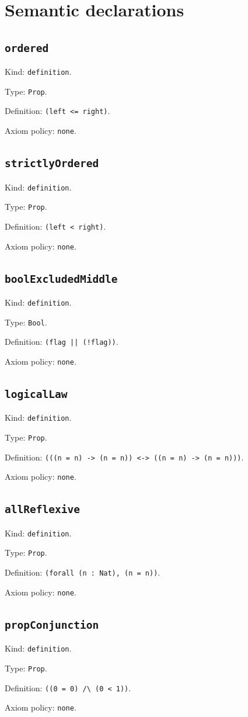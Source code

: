 \documentclass[11pt]{article}
\begin{document}
\section*{Semantic declarations}
\subsection*{\texttt{ordered}}
\noindent Kind: \texttt{definition}.\par
\noindent Type: \texttt{Prop}.\par
\noindent Definition: \texttt{(left <= right)}.\par
\noindent Axiom policy: \texttt{none}.\par
\subsection*{\texttt{strictlyOrdered}}
\noindent Kind: \texttt{definition}.\par
\noindent Type: \texttt{Prop}.\par
\noindent Definition: \texttt{(left < right)}.\par
\noindent Axiom policy: \texttt{none}.\par
\subsection*{\texttt{boolExcludedMiddle}}
\noindent Kind: \texttt{definition}.\par
\noindent Type: \texttt{Bool}.\par
\noindent Definition: \texttt{(flag || (!flag))}.\par
\noindent Axiom policy: \texttt{none}.\par
\subsection*{\texttt{logicalLaw}}
\noindent Kind: \texttt{definition}.\par
\noindent Type: \texttt{Prop}.\par
\noindent Definition: \texttt{(((n = n) -> (n = n)) <-> ((n = n) -> (n = n)))}.\par
\noindent Axiom policy: \texttt{none}.\par
\subsection*{\texttt{allReflexive}}
\noindent Kind: \texttt{definition}.\par
\noindent Type: \texttt{Prop}.\par
\noindent Definition: \texttt{(forall (n : Nat), (n = n))}.\par
\noindent Axiom policy: \texttt{none}.\par
\subsection*{\texttt{propConjunction}}
\noindent Kind: \texttt{definition}.\par
\noindent Type: \texttt{Prop}.\par
\noindent Definition: \texttt{((0 = 0) /\textbackslash{} (0 < 1))}.\par
\noindent Axiom policy: \texttt{none}.\par
\end{document}
